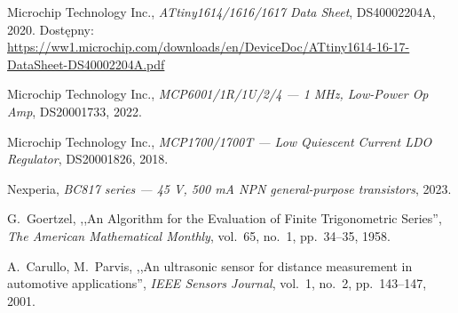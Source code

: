 \documentclass[a4paper,11pt]{article}
\begin{document}
\begin{enumerate}[label={[\arabic*]}, nosep]
    \item Microchip Technology Inc., \textit{ATtiny1614/1616/1617 Data Sheet},
          DS40002204A, 2020. Dostępny:
          \url{https://ww1.microchip.com/downloads/en/DeviceDoc/ATtiny1614-16-17-DataSheet-DS40002204A.pdf}
    \item Microchip Technology Inc., \textit{MCP6001/1R/1U/2/4 --- 1 MHz, Low-Power
          Op Amp}, DS20001733, 2022.
    \item Microchip Technology Inc., \textit{MCP1700/1700T --- Low Quiescent Current
          LDO Regulator}, DS20001826, 2018.
    \item Nexperia, \textit{BC817 series --- 45 V, 500 mA NPN general-purpose transistors},
          2023.
    \item G.~Goertzel, ,,An Algorithm for the Evaluation of Finite Trigonometric Series'',
          \textit{The American Mathematical Monthly}, vol.~65, no.~1, pp.~34--35, 1958.
    \item A.~Carullo, M.~Parvis, ,,An ultrasonic sensor for distance measurement
          in automotive applications'', \textit{IEEE Sensors Journal}, vol.~1, no.~2,
          pp.~143--147, 2001.
\end{enumerate}
\end{document}
